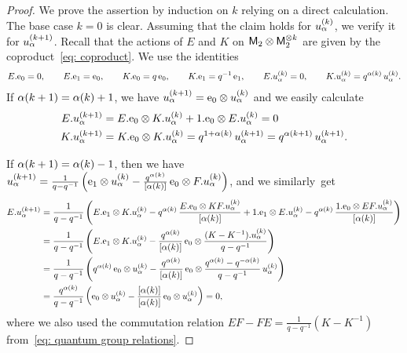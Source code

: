 \documentclass[oneside,english]{amsart}
\numberwithin{equation}{section}
\numberwithin{figure}{section}
\theoremstyle{plain}
\theoremstyle{plain}
\theoremstyle{plain}
\theoremstyle{remark}
\theoremstyle{plain}
\theoremstyle{plain}
\theoremstyle{plain}
\theoremstyle{plain}
\theoremstyle{plain}
\theoremstyle{plain}
\theoremstyle{plain}
\theoremstyle{plain}
\begin{document}
\begin{proof}
We prove the assertion by induction on $k$ relying on a direct calculation. 
The base case $k=0$ is clear. Assuming that the claim holds for $u_\alpha^{(k)}$,
we verify it for $u_\alpha^{(k+1)}$.
Recall that the actions of $E$ and $K$ on $\mathsf{M}_2 \otimes \mathsf{M}_2^{\otimes k}$ are given by the 
coproduct~\eqref{eq: coproduct}. We %
use the identities
\begin{align*}
E.\mathrm{e}_0 = 0, \qquad E.\mathrm{e}_1 = \mathrm{e}_0, \qquad
K.\mathrm{e}_0 = q\,\mathrm{e}_0, \qquad K.\mathrm{e}_1 = q^{-1}\,\mathrm{e}_1, \qquad
E.u_\alpha^{(k)} = 0, \qquad K.u_\alpha^{(k)} = q^{\alpha(k)}\,u_\alpha^{(k)}.
\end{align*}
If $\alpha(k+1) = \alpha(k)+1$, we have 
$u_\alpha^{(k+1)} = \mathrm{e}_0 \otimes u_\alpha^{(k)}$ and we easily calculate
\begin{align*}
E.u_\alpha^{(k+1)} = \; & E.\mathrm{e}_0 \otimes K.u_\alpha^{(k)}
 + 1.\mathrm{e}_0 \otimes E.u_\alpha^{(k)} = 0 \\
K.u_\alpha^{(k+1)} = \; & K.\mathrm{e}_0 \otimes K.u_\alpha^{(k)} 
= q^{1+\alpha(k)} \, u_\alpha^{(k+1)} = q^{\alpha(k+1)}\,u_\alpha^{(k+1)}.
\end{align*}

If $\alpha(k+1) = \alpha(k)-1$, 
then we have
$u_\alpha^{(k+1)} 
= \frac{1}{q-q^{-1}}\left( \mathrm{e}_1 \otimes u_\alpha^{(k)} 
- \frac{q^{\alpha(k)}}{\left[\alpha(k)\right]}\,\mathrm{e}_0 \otimes F.u_\alpha^{(k)} \right)$, 
and we similarly~get
\begin{align*}
E.u_\alpha^{(k+1)} = \; & \frac{1}{q-q^{-1}} \left(
E.\mathrm{e}_1 \otimes K.u_\alpha^{(k)} 
- q^{\alpha(k)}\, \frac{E.\mathrm{e}_0 \otimes KF.u_\alpha^{(k)}}{\left[\alpha(k)\right]}
+ 1.\mathrm{e}_1 \otimes E.u_\alpha^{(k)} 
- q^{\alpha(k)}\,
\frac{1.\mathrm{e}_0 \otimes EF.u_\alpha^{(k)}}{\left[\alpha(k)\right]} \right) \\
= \; & \frac{1}{q-q^{-1}}\left(
E.\mathrm{e}_1 \otimes K.u_\alpha^{(k)} 
- \frac{q^{\alpha(k)}}{\left[\alpha(k)\right]}\,\mathrm{e}_0 \otimes 
\frac{(K-K^{-1}).u_\alpha^{(k)}}{q-q^{-1}} \right) \\
= \; & \frac{1}{q-q^{-1}}\left(
q^{\alpha(k)}\, \mathrm{e}_0 \otimes u_\alpha^{(k)} 
- \frac{q^{\alpha(k)}}{\left[\alpha(k)\right]} \,\mathrm{e}_0 \otimes 
\frac{q^{\alpha(k)}-q^{-\alpha(k)}}{q-q^{-1}} \, u_\alpha^{(k)} \right) \\
= \; & \frac{q^{\alpha(k)}}{q-q^{-1}}\left(
\mathrm{e}_0 \otimes u_\alpha^{(k)} 
- \frac{\left[\alpha(k)\right]}{\left[\alpha(k)\right]} \,\mathrm{e}_0 \otimes u_\alpha^{(k)} \right) 
= 0,
\end{align*}
where we also used the commutation relation 
$EF-FE = \frac{1}{q-q^{-1}}\left(K-K^{-1}\right)$ from~\eqref{eq: quantum group relations}.


\end{proof}
\end{document}
